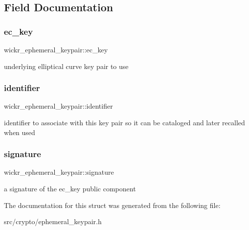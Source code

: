 \subsection{Field Documentation}
\mbox{\label{structwickr__ephemeral__keypair_ad730ed9ba92e05d0a271edc838e548fe}} 
\subsubsection{\texorpdfstring{ec\+\_\+key}{ec\_key}}
{\footnotesize\ttfamily wickr\+\_\+ephemeral\+\_\+keypair\+::ec\+\_\+key}

underlying elliptical curve key pair to use \mbox{\label{structwickr__ephemeral__keypair_a9220b37a7db764818406bcc84e3ba86b}} 
\subsubsection{\texorpdfstring{identifier}{identifier}}
{\footnotesize\ttfamily wickr\+\_\+ephemeral\+\_\+keypair\+::identifier}

identifier to associate with this key pair so it can be cataloged and later recalled when used \mbox{\label{structwickr__ephemeral__keypair_aea420be2397d798a560fa973be86228c}} 
\subsubsection{\texorpdfstring{signature}{signature}}
{\footnotesize\ttfamily wickr\+\_\+ephemeral\+\_\+keypair\+::signature}

a signature of the \textquotesingle{}ec\+\_\+key\textquotesingle{} public component 

The documentation for this struct was generated from the following file\+:\begin{DoxyCompactItemize}
\item 
src/crypto/ephemeral\+\_\+keypair.\+h\end{DoxyCompactItemize}
